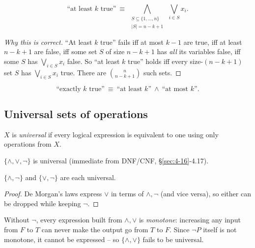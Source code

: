\documentclass[11pt]{article}
\begin{document}
\begin{definition}
\[
\text{``at least } k \text{ true''} \ \equiv\ \bigwedge_{\substack{S\subseteq\{1,\dots,n\} \\ |S|=n-k+1}} \ \bigvee_{i\in S} x_i.
\]
\end{definition}
\begin{proof}[Why this is correct]
``At least $k$ true'' fails iff at most $k-1$ are true, iff at least $n-k+1$ are false, iff some set $S$ of size $n-k+1$ has \emph{all} its variables false, iff some $S$ has $\bigvee_{i\in S}x_i$ false. So ``at least $k$ true'' holds iff every size-$(n{-}k{+}1)$ set $S$ has $\bigvee_{i\in S}x_i$ true. There are $\binom{n}{n-k+1}$ such sets.
\end{proof}

\begin{definition}[Exactly $k$]
\[
\text{``exactly } k \text{ true''} \ \equiv\ \text{``at least } k\text{''} \ \wedge\ \text{``at most } k\text{''}.
\]
\end{definition}

\subsection{Universal sets of operations}
\label{sec:4-20}

\begin{definition}
$X$ is \emph{universal} if every logical expression is equivalent to one using only operations from $X$.
\end{definition}

\begin{theorem}
$\{\wedge,\vee,\neg\}$ is universal (immediate from DNF/CNF, \S\ref{sec:4-16}-4.17).
\end{theorem}

\begin{theorem}
$\{\wedge,\neg\}$ and $\{\vee,\neg\}$ are each universal.
\end{theorem}
\begin{proof}
De Morgan's laws express $\vee$ in terms of $\wedge,\neg$ (and vice versa), so either can be dropped while keeping $\neg$.
\end{proof}

\bigskip
\begin{note}
Without $\neg$, every expression built from $\wedge,\vee$ is \emph{monotone}: increasing any input from $F$ to $T$ can never make the output go from $T$ to $F$. Since $\neg P$ itself is not monotone, it cannot be expressed -- so $\{\wedge,\vee\}$ fails to be universal.
\end{note}
\end{document}
